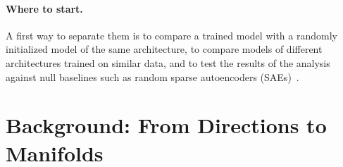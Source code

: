 \documentclass[11pt,a4paper]{article}
\newcommand{\fromclaude}[1]{\textcolor{orange!85!black}{#1}}
\newcommand{\fromclaude}[1]{#1}
\begin{document}
\paragraph{Where to start.}
A first way to separate them is to compare a trained model with a randomly initialized model of the same architecture, to compare models of different architectures trained on similar data, and to test the results of the analysis against null baselines such as random sparse autoencoders (SAEs)~\cite{korznikov2026sanity}.

\section{Background: From Directions to Manifolds}
\end{document}
